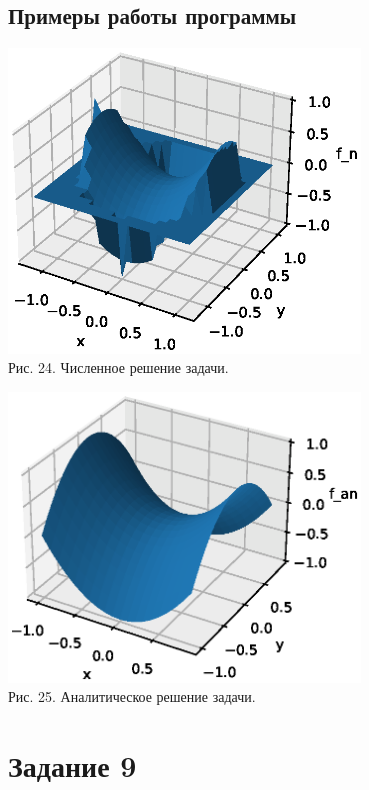 \documentclass[11pt]{article}
\begin{document}
\subsection{Примеры работы программы}
\begin{center}
	\includegraphics[width=0.7\textwidth]{8_1.eps}\\
	{Рис. 24. Численное решение задачи. }
\end{center}
\begin{center}
	\includegraphics[width=0.7\textwidth]{8_2.eps}\\
	{Рис. 25. Аналитическое решение задачи. }
\end{center}

\newpage

\section{Задание 9}
\end{document}
